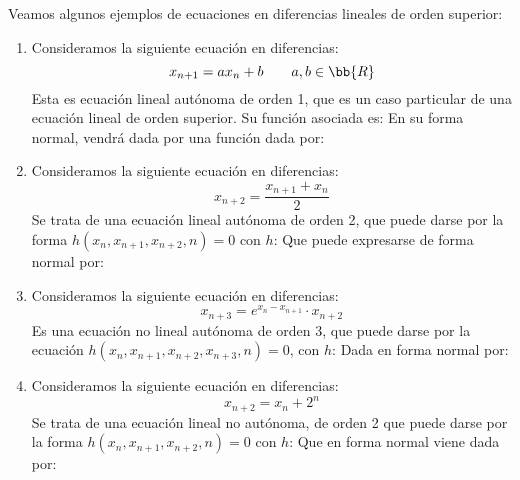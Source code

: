 \begin{ejemplo} Veamos algunos ejemplos de ecuaciones en diferencias lineales de orden superior:
\begin{enumerate}
    \item Consideramos la siguiente ecuación en diferencias:
    \begin{equation*}
        x_{n+1} = ax_n + b\qquad a,b \in \bb{R}
    \end{equation*}
    Esta es ecuación lineal autónoma de orden 1, que es un caso particular de una ecuación lineal de orden superior. Su función asociada es:
    En su forma normal, vendrá dada por una función dada por:
    
    
    \item Consideramos la siguiente ecuación en diferencias:
        \begin{equation*}
            x_{n+2} = \dfrac{x_{n+1}+x_n}{2}
        \end{equation*}
        Se trata de una ecuación lineal autónoma de orden 2, que puede darse por la forma $h(x_n, x_{n+1}, x_{n+2}, n)= 0$ con $h$:
        Que puede expresarse de forma normal por:

    \item Consideramos la siguiente ecuación en diferencias:
        \begin{equation*}
            x_{n+3} = e^{x_n-x_{n+1}} \cdot x_{n+2}
        \end{equation*}
        Es una ecuación no lineal autónoma de orden 3, que puede darse por la ecuación $h(x_n, x_{n+1}, x_{n+2}, x_{n+3}, n)=0$, con $h$:
        Dada en forma normal por:

    \item Consideramos la siguiente ecuación en diferencias:
        \begin{equation*}
            x_{n+2} = x_n + 2^n
        \end{equation*}
        Se trata de una ecuación lineal no autónoma, de orden 2 que puede darse por la forma $h(x_n, x_{n+1}, x_{n+2}, n)= 0$ con $h$:
        Que en forma normal viene dada por:
\end{enumerate}
\end{ejemplo}

